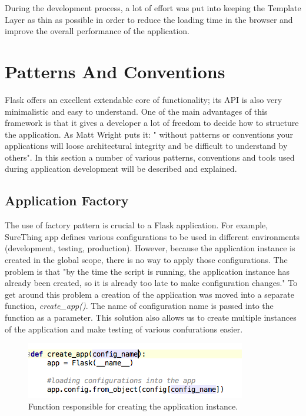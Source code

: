 During the development process, a lot of effort was put into keeping the Template Layer as thin as possible in order to reduce the loading time in the browser and improve the overall performance of the application.

\section{Patterns And Conventions}
Flask offers an excellent extendable core of functionality; its API is also very minimalistic and easy to understand. One of the  main advantages of this framework is that it gives a developer a lot of freedom to decide how to structure the application. As Matt Wright \cite{article:howIstructureMyFlaskApps} puts it: " without patterns or conventions your applications will loose architectural integrity and be difficult to understand by others". In this section a number of various patterns, conventions and tools used during application development will be described and explained. 

\subsection{Application Factory}
The use of factory pattern is crucial to a Flask application. For example, SureThing app defines various configurations to be used in different environments (development, testing, production). However, because the application instance is created in the global scope, there is no way to apply those configurations. The problem is that "by the time the script is running, the application instance has already been created, so it is already too late to make configuration changes." \cite{book:Grindberg2014FlaskWebDevelopment} To get around this problem a creation of the application was moved into a separate function, \emph{create\_app()}. The name of configuration name is passed into the function as a parameter. This solution also allows us to create multiple instances of the application and make testing of various confurations easier.\cite{documentation:FlaskApplicationFactories} 

\begin{figure}[H]
	\begin{center}
		\includegraphics[width=.40\linewidth,natwidth=610,natheight=642]{impl/images/createApp}
		\caption{Function responsible for creating the application instance.} \label{fig:using:createApp}
	\end{center}
\end{figure}

